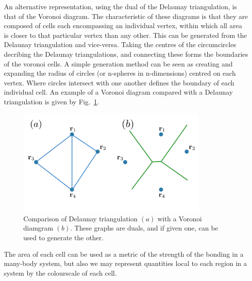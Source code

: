 An alternative representation, using the dual of the Delaunay triangulation, is that of the Voronoi diagram. The characteristic of these diagrams is that they are composed of cells each encompassing an individual vertex, within which all area is closer to that particular vertex than any other. This can be generated from the Delaunay triangulation and vice-versa. Taking the centres of the circumcircles decribing the Delaunay triangulations, and connecting these forms the boundaries of the voronoi cells. A simple generation method can be seen as creating and expanding the radius of circles (or n-spheres in n-dimensions) centred on each vertex. Where circles intersect with one another defines the boundary of each individual cell. An example of a Voronoi diagram compared with a Delaunay triangulation is given by Fig.~\ref{fig:voronoi}.
\begin{figure}\centering
    \includegraphics[width=0.85\textwidth]{Images/ch6_phasegineer/imgs/voronoi}
    \caption{Comparison of Delaunay triangulation $(a)$ with a Voronoi diamgram $(b)$. These graphs are duals, and if given one, can be used to generate the other.}\label{fig:voronoi}
\end{figure}
The area of each cell can be used as a metric of the strength of the bonding in a many-body system, but also we may represent quantities local to each region in a system by the colourscale of each cell.

